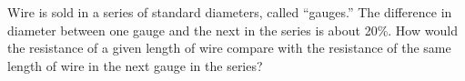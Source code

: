Wire is sold in a series of standard diameters, called
        ``gauges.'' The difference in diameter between one gauge and
        the next in the series is about 20\%. How would the
        resistance of a given length of wire 
        compare with the resistance of the same length of wire in
        the next gauge in the series?
        \answercheck
